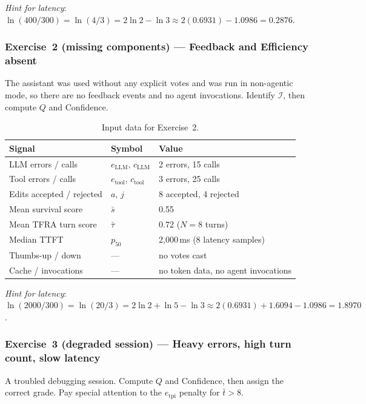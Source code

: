 \documentclass[11pt,a4paper]{article}
\newcommand{\calI}{\mathcal{I}}
\begin{document}
\noindent\emph{Hint for latency}:
$\ln(400/300) = \ln(4/3) = 2\ln2 - \ln3 \approx 2(0.6931) - 1.0986 = 0.2876$.

\subsubsection*{Exercise~2 \textmd{(missing components)} --- Feedback and Efficiency absent}
\label{app:ex2}

The assistant was used without any explicit votes and was run in
non-agentic mode, so there are no feedback events and no agent invocations.
Identify $\calI$, then compute $Q$ and Confidence.

\begin{table}[h!]
\centering
\caption{Input data for Exercise~2.}
\label{tab:ex2-input}
\begin{tabular}{@{}lll@{}}
\toprule
Signal & Symbol & Value \\
\midrule
LLM errors / calls & $e_{\text{LLM}},\,c_{\text{LLM}}$ & 2 errors, 15 calls \\
Tool errors / calls & $e_{\text{tool}},\,c_{\text{tool}}$ & 3 errors, 25 calls \\
Edits accepted / rejected & $a,\,j$ & 8 accepted, 4 rejected \\
Mean survival score & $\bar{s}$ & 0.55 \\
Mean TFRA turn score & $\bar{\tau}$ & 0.72 \hfill($N=8$ turns) \\
Median TTFT & $p_{50}$ & 2{,}000\,ms \hfill(8 latency samples) \\
Thumbs-up / down & --- & no votes cast \\
Cache / invocations & --- & no token data, no agent invocations \\
\bottomrule
\end{tabular}
\end{table}

\noindent\emph{Hint for latency}:
$\ln(2000/300)=\ln(20/3)=2\ln2+\ln5-\ln3
\approx 2(0.6931)+1.6094-1.0986=1.8970$.

\subsubsection*{Exercise~3 \textmd{(degraded session)} --- Heavy errors, high turn count, slow latency}
\label{app:ex3}

A troubled debugging session.  Compute $Q$ and Confidence, then assign
the correct grade.  Pay special attention to the $e_{\mathrm{tpi}}$
penalty for $\bar{t}>8$.
\end{document}
